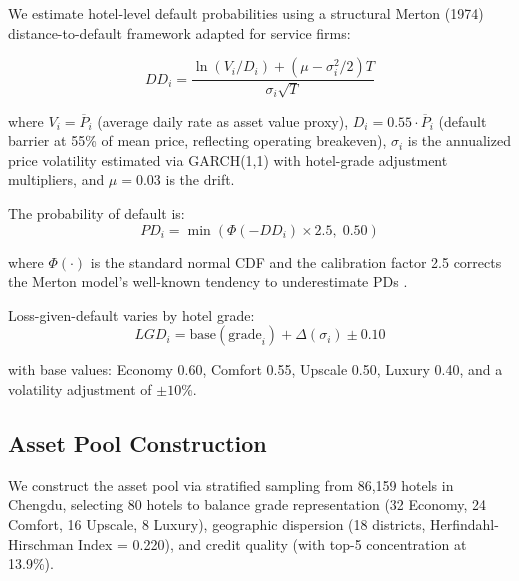 \documentclass[12pt,a4paper]{article}
\begin{document}
We estimate hotel-level default probabilities using a structural Merton (1974) distance-to-default framework adapted for service firms:

\begin{equation}
    DD_i = \frac{\ln(V_i / D_i) + (\mu - \sigma_i^2/2)T}{\sigma_i \sqrt{T}}
\end{equation}

where $V_i = \overline{P}_i$ (average daily rate as asset value proxy), $D_i = 0.55 \cdot \overline{P}_i$ (default barrier at 55\% of mean price, reflecting operating breakeven), $\sigma_i$ is the annualized price volatility estimated via GARCH(1,1) with hotel-grade adjustment multipliers, and $\mu = 0.03$ is the drift.

The probability of default is:
\begin{equation}
    PD_i = \min\left( \Phi(-DD_i) \times 2.5,\; 0.50 \right)
\end{equation}

where $\Phi(\cdot)$ is the standard normal CDF and the calibration factor 2.5 corrects the Merton model's well-known tendency to underestimate PDs \cite{bharath2008}.

Loss-given-default varies by hotel grade:
\begin{equation}
    LGD_i = \text{base}(\text{grade}_i) + \Delta(\sigma_i) \pm 0.10
\end{equation}

with base values: Economy 0.60, Comfort 0.55, Upscale 0.50, Luxury 0.40, and a volatility adjustment of $\pm 10\%$.

\subsection{Asset Pool Construction}

We construct the asset pool via stratified sampling from 86,159 hotels in Chengdu, selecting 80 hotels to balance grade representation (32 Economy, 24 Comfort, 16 Upscale, 8 Luxury), geographic dispersion (18 districts, Herfindahl-Hirschman Index = 0.220), and credit quality (with top-5 concentration at 13.9\%).
\end{document}
